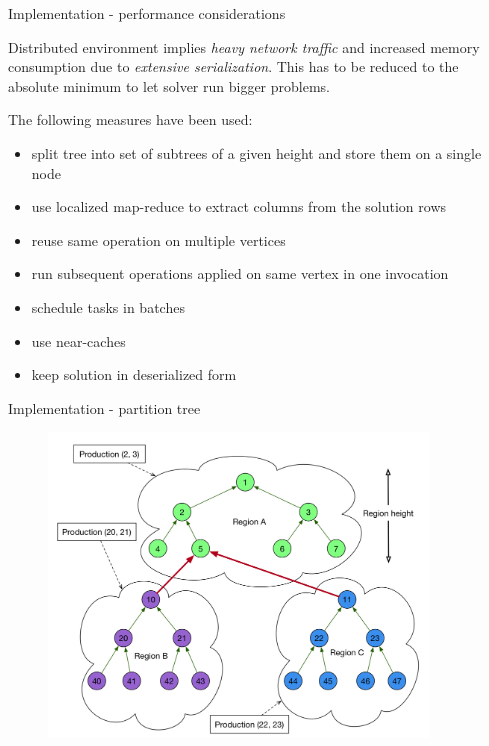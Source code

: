 \documentclass[c]{beamer}
\begin{document}
\begin{frame}{Implementation - performance considerations}

Distributed environment implies \emph{heavy network traffic} and increased memory consumption due to \emph{extensive serialization}. This has to be reduced to the absolute minimum to let solver run bigger problems.
\vskip 0.1in

The following measures have been used:
\begin{itemize}
  \item split tree into set of subtrees of a given height and store them on a single node
  \item use localized map-reduce to extract columns from the solution rows
  \item reuse same operation on multiple vertices
  \item run subsequent operations applied on same vertex in one invocation
  \item schedule tasks in batches
  \item use near-caches
  \item keep solution in deserialized form
\end{itemize}

\end{frame}


\begin{frame}{Implementation - partition tree}

   \begin{figure}
      \centering
      \includegraphics[width=0.9\textwidth]{img/graph-idea.png}
    \end{figure}

\end{frame}
\end{document}
